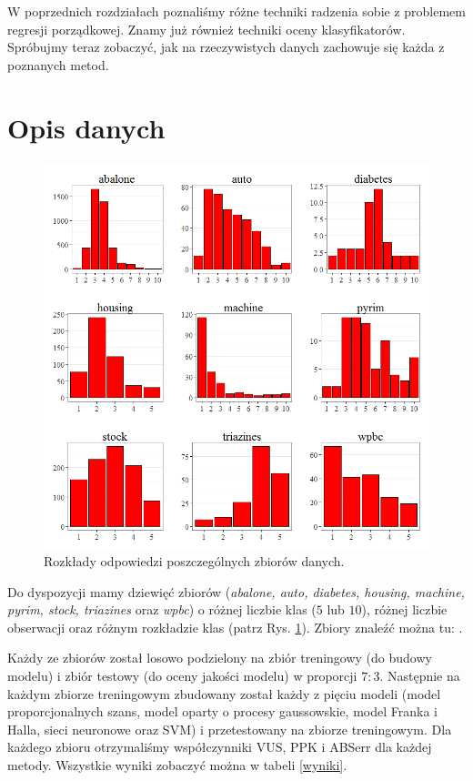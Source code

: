 \documentclass{mini}
\begin{document}
W poprzednich rozdziałach poznaliśmy różne techniki radzenia sobie z problemem regresji porządkowej. Znamy już również techniki oceny klasyfikatorów. Spróbujmy teraz zobaczyć, jak na rzeczywistych danych zachowuje się każda z poznanych metod. 

\section{Opis danych}

\begin{figure}[h!t]
\begin{center}
\includegraphics[scale=0.6]{graphics/rozklad_odpowiedzi.png}
\end{center}
\caption{Rozkłady odpowiedzi poszczególnych zbiorów danych.}
\label{rozkladdanych}
\end{figure}

Do dyspozycji mamy dziewięć zbiorów (\textit{abalone, auto, diabetes, housing, machine, pyrim, stock, triazines} oraz \textit{wpbc}) o różnej liczbie klas ($5$ lub $10$), różnej liczbie obserwacji oraz różnym rozkładzie klas (patrz Rys. \ref{rozkladdanych}). Zbiory znaleźć można tu: \cite{zbiorki}. 

Każdy ze zbiorów został losowo podzielony na zbiór treningowy (do budowy modelu) i zbiór testowy (do oceny jakości modelu) w proporcji $7:3$. Następnie na każdym zbiorze treningowym zbudowany został każdy z pięciu modeli (model proporcjonalnych szans, model oparty o procesy gaussowskie, model Franka i Halla, sieci neuronowe oraz SVM) i przetestowany na zbiorze treningowym. Dla każdego zbioru otrzymaliśmy współczynniki VUS, PPK i ABSerr dla każdej metody. Wszystkie wyniki zobaczyć można w tabeli \ref{wyniki}.
\end{document}
